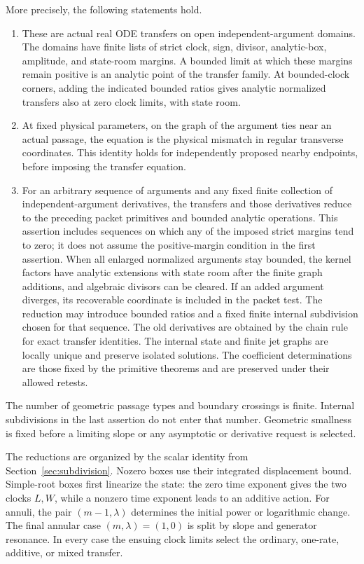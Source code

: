 \begin{theorem}
More precisely, the following statements hold.
\begin{enumerate}
\item These are actual real ODE transfers on open independent-argument
domains.  The domains have finite lists of strict clock, sign, divisor,
analytic-box, amplitude, and state-room margins.  A bounded limit at which
these margins remain positive is an analytic point of the transfer family.
At bounded-clock corners, adding the indicated bounded ratios gives analytic
normalized transfers also at zero clock limits, with state room.
\item At fixed physical parameters, on the graph of the argument ties near
an actual passage, the equation is the physical mismatch in regular
transverse coordinates.  This identity holds for independently proposed
nearby endpoints, before imposing the transfer equation.
\item For an arbitrary sequence of arguments and any fixed finite collection
of independent-argument derivatives, the transfers and those derivatives
reduce to the preceding packet primitives and bounded analytic operations.
This assertion includes sequences on which any of the imposed strict
margins tend to zero; it does not assume the positive-margin condition in
the first assertion.  When all enlarged normalized arguments stay bounded,
the kernel factors have analytic extensions with state room after the
finite graph additions, and algebraic divisors can be cleared.  If an added
argument diverges, its recoverable coordinate is included in the packet
test.
The reduction may introduce bounded ratios and a fixed finite internal
subdivision chosen for that sequence.  The old derivatives are obtained by
the chain rule for exact transfer identities.  The internal state and finite
jet graphs are locally unique and preserve isolated solutions.
The coefficient determinations are those fixed by the primitive theorems
and are preserved under their allowed retests.
\end{enumerate}
The number of geometric passage types and boundary crossings is finite.
Internal subdivisions in the last assertion do not enter that number.
Geometric smallness is fixed before a limiting slope or any asymptotic or
derivative request is selected.
\end{theorem}

The reductions are organized by the scalar identity from
Section~\ref{sec:subdivision}.  Nozero boxes use their integrated
displacement bound.  Simple-root boxes first linearize the state:
the zero time exponent gives the two clocks \(L,W\), while a nonzero
time exponent leads to an additive action.  For annuli, the pair
\((m-1,\lambda)\) determines the initial power or logarithmic change.
The final annular case \((m,\lambda)=(1,0)\) is split by slope and
generator resonance.  In every case the ensuing clock limits select
the ordinary, one-rate, additive, or mixed transfer.

